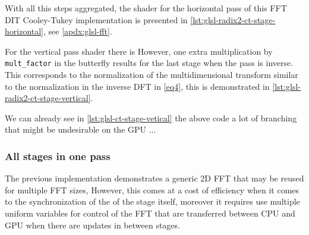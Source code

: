 \documentclass[
  oneside,
  11pt, a4paper,
  footinclude=true,
  headinclude=true,
  cleardoublepage=empty
]{scrbook}
\begin{document}




With all this steps aggregated, the shader for the horizontal pass of this FFT DIT Cooley-Tukey implementation is presented in \autoref{lst:glsl-radix2-ct-stage-horizontal}, see \autoref{apdx:glsl-fft}.


For the vertical pass shader there is However, one extra multiplication by \texttt{mult\_factor} in the butterfly results for the last stage when the pass is inverse. This corresponds to the normalization of the multidimensional transform similar to the normalization in the inverse DFT in \autoref{eq4}, this is demonstrated in \autoref{lst:glsl-radix2-ct-stage-vertical}.

We can already see in \autoref{lst:glsl-ct-stage-vetical} the above code a lot of branching that might be undesirable on the GPU  ... %

\subsubsection{All stages in one pass} \label{subsec:all-stages-in-one-pass}

The previous implementation demonstrates a generic 2D FFT that may be reused for multiple FFT sizes, However, this comes at a cost of efficiency when it comes to the synchronization of the of the stage itself, moreover it requires use multiple uniform variables for control of the FFT that are transferred between CPU and GPU when there are updates in between stages.
\newline
\end{document}
